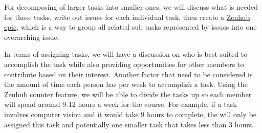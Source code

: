 \documentclass[12pt,letterpaper]{article}
\begin{document}
For decomposing of larger tasks into smaller ones, we will discuss what is
needed for those tasks, write out issues for each individual task, then create a
\href{https://blog.zenhub.com/working-with-epics-in-github/}{Zenhub epic}, which
is a way to group all related sub tasks represented by issues into one
overarching issue.

In terms of assigning tasks, we will have a discussion on who is best suited to
accomplish the task while also providing opportunities for other members to
contribute based on their interest. Another factor that need to be considered is
the amount of time each person has per week to accomplish a task. Using the
Zenhub counter feature, we will be able to divide the tasks up so each member
will spend around 9-12 hours a week for the course. For example, if a task
involves computer vision and it would take 9 hours to complete, the
 will only be assigned this task and potentially one smaller
task that takes less than 3 hours.
\end{document}

